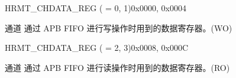 \begin{register}{H}{RMT\_CHDATA\_REG ( = 0, 1)}{0x0000, 0x0004}\label{regdesc:RMTCHNDATAREG}
%
\regnewline%
\begin{regdesc}\begin{reglist}
\label{fielddesc:RMTCHNDATA}\item [RMT\_CH\regindex{n}DATA] 通道  通过 APB FIFO 进行写操作时用到的数据寄存器。(WO)
\end{reglist}\end{regdesc}
\end{register}

\begin{register}{H}{RMT\_CHDATA\_REG ( = 2, 3)}{0x0008, 0x000C}\label{regdesc:RMTCHMDATAREG}
%
\regnewline%
\begin{regdesc}\begin{reglist}
\label{fielddesc:RMTCHMDATA}\item [RMT\_CH\regindex{m}DATA] 通道  通过 APB FIFO 进行读操作时用到的数据寄存器。(RO)
\end{reglist}\end{regdesc}
\end{register}


